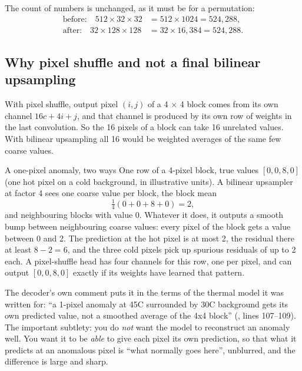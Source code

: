 The count of numbers is unchanged, as it must be for a permutation:
\begin{align*}
\text{before:}\quad 512 \times 32 \times 32 &= 512 \times 1024 = 524{,}288,\\
\text{after:}\quad 32 \times 128 \times 128 &= 32 \times 16{,}384 = 524{,}288 .
\end{align*}


\subsection{Why pixel shuffle and not a final bilinear upsampling}

With pixel shuffle, output pixel $(i, j)$ of a 4 $\times$ 4 block comes from its own channel $16c + 4i
+ j$, and that channel is produced by its own row of weights in the last convolution. So the 16 pixels
of a block can take 16 unrelated values. With bilinear upsampling all 16 would be weighted averages of
the same few coarse values.

\begin{worked}[label={we:decoder:spike}]{A one-pixel anomaly, two ways}
One row of a 4-pixel block, true values $[0, 0, 8, 0]$ (one hot pixel on a cold background, in
illustrative units). A bilinear upsampler at factor 4 sees one coarse value per block, the block mean
\[
\tfrac14 (0 + 0 + 8 + 0) = 2,
\]
and neighbouring blocks with value 0. Whatever it does, it outputs a smooth bump between neighbouring
coarse values: every pixel of the block gets a value between 0 and 2. The prediction at the hot pixel is
at most 2, the residual there at least $8 - 2 = 6$, and the three cold pixels pick up spurious residuals
of up to 2 each. A pixel-shuffle head has four channels for this row, one per pixel, and can output
$[0, 0, 8, 0]$ exactly if its weights have learned that pattern.
\end{worked}

The decoder's own comment puts it in the terms of the thermal model it was written for: ``a 1-pixel
anomaly at 45\textdegree C surrounded by 30\textdegree C background gets its own predicted value, not a
smoothed average of the 4x4 block'' (, lines 107--109). The important
subtlety: you do \emph{not} want the model to reconstruct an anomaly well. You want it to be
\emph{able} to give each pixel its own prediction, so that what it predicts at an anomalous pixel is
``what normally goes here'', unblurred, and the difference is large and sharp.

